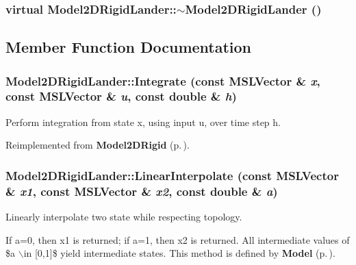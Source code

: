 \subsubsection{\setlength{\rightskip}{0pt plus 5cm}virtual Model2DRigid\-Lander::$\sim$Model2DRigid\-Lander ()\hspace{0.3cm}{\tt  [inline, virtual]}}\label{classModel2DRigidLander_a1}




\subsection{Member Function Documentation}
\subsubsection{ Model2DRigid\-Lander::Integrate (const {\bf MSLVector} \& {\em x}, const {\bf MSLVector} \& {\em u}, const double \& {\em h})\hspace{0.3cm}{\tt  [virtual]}}\label{classModel2DRigidLander_a4}


Perform integration from state x, using input u, over time step h.



Reimplemented from {\bf Model2DRigid} {\rm (p.\,\pageref{classModel2DRigid_a2})}.
\subsubsection{ Model2DRigid\-Lander::Linear\-Interpolate (const {\bf MSLVector} \& {\em x1}, const {\bf MSLVector} \& {\em x2}, const double \& {\em a})\hspace{0.3cm}{\tt  [virtual]}}\label{classModel2DRigidLander_a5}


Linearly interpolate two state while respecting topology.

If a=0, then x1 is returned; if a=1, then x2 is returned. All intermediate values of \$a $\backslash$in [0,1]\$ yield intermediate states. This method is defined by {\bf Model} {\rm (p.\,\pageref{classModel})}. 

